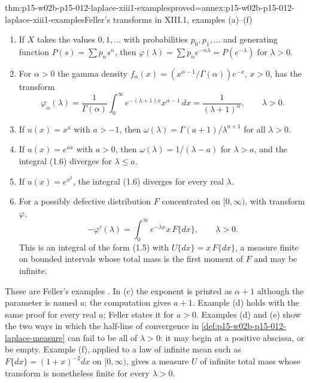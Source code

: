 \begin{hbtheorem}{thm:p15-w02b-p15-012-laplace-xiii1-examples}{proved=annex:p15-w02b-p15-012-laplace-xiii1-examples}{Feller's transforms in XIII.1, examples (a)--(f)}
\begin{enumerate}
\item[(a)] If \(X\) takes the values \(0,1,\ldots\) with probabilities
      \(p_0,p_1,\ldots\) and generating function \(P(s)=\sum p_ns^n\), then
      \(\varphi(\lambda)=\sum p_ne^{-n\lambda}=P(e^{-\lambda})\) for
      \(\lambda>0\).
\item[(b)] For \(\alpha>0\) the gamma density
      \(f_\alpha(x)=(x^{\alpha-1}/\Gamma(\alpha))e^{-x}\), \(x>0\), has the
      transform
      \[
       \varphi_\alpha(\lambda)=\frac1{\Gamma(\alpha)}\int_0^\infty e^{-(\lambda+1)x}x^{\alpha-1}\,dx
         =\frac1{(\lambda+1)^\alpha},\qquad\lambda>0.
       \tag{1.3}
      \]
\item[(c)] If \(u(x)=x^a\) with \(a>-1\), then
      \(\omega(\lambda)=\Gamma(a+1)/\lambda^{a+1}\) for all \(\lambda>0\).
\item[(d)] If \(u(x)=e^{ax}\) with \(a>0\), then
      \(\omega(\lambda)=1/(\lambda-a)\) for \(\lambda>a\), and the integral
      (1.6) diverges for \(\lambda\leq a\).
\item[(e)] If \(u(x)=e^{x^2}\), the integral (1.6) diverges for every real
      \(\lambda\).
\item[(f)] For a possibly defective distribution \(F\) concentrated on
      \([0,\infty)\), with transform \(\varphi\),
      \[
       -\varphi'(\lambda)=\int_0^\infty e^{-\lambda x}x\,F\{dx\},\qquad\lambda>0.
       \tag{1.7}
      \]
      This is an integral of the form (1.5) with \(U\{dx\}=x\,F\{dx\}\), a
      measure finite on bounded intervals whose total mass is the first
      moment of \(F\) and may be infinite.
\end{enumerate}
\end{hbtheorem}

These are Feller's examples \cite[vol.~II, XIII.1, pp.~430--431]{Feller1971ProbabilityII}.
In (c) the exponent is printed as \(\alpha+1\) although the parameter is
named \(a\); the computation gives \(a+1\). Example (d) holds with the same
proof for every real \(a\); Feller states it for \(a>0\). Examples (d) and (e)
show the two ways in which the half-line of convergence in
\cref{def:p15-w02b-p15-012-laplace-measure} can fail to be all of
\(\lambda>0\): it may begin at a positive abscissa, or be empty. Example (f),
applied to a law of infinite mean such as \(F\{dx\}=(1+x)^{-2}dx\) on
\([0,\infty)\), gives a measure \(U\) of infinite total mass whose transform
is nonetheless finite for every \(\lambda>0\).

